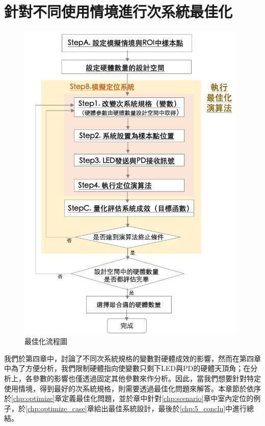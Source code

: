 \chapter{針對不同使用情境進行次系統最佳化}
\label{chp:5}

\begin{figure}[htpb]
    \centering
    \includegraphics[width=11cm]{ch5pic/optimize_flow.png}
    \caption{最佳化流程圖}
    \label{pic:optimize_flow}
\end{figure}

我們於第四章中，討論了不同次系統規格的變數對硬體成效的影響，然而在第四章中為了方便分析，我們限制硬體指向使變數只剩下LED與PD的硬體天頂角；在分析上，各參數的影響也僅透過固定其他參數來作分析。因此，當我們想要針對特定使用情境，得到最好的次系統規格，則需要透過最佳化問題來解答。本章節於依序於\ref{chp:optimize}章定義最佳化問題，並於章中針對\ref{chp:scenario}章中室內定位的例子，於\ref{chp:optimize_case}章給出最佳系統設計，最後於\ref{chp:5_conclu}中進行總結。




